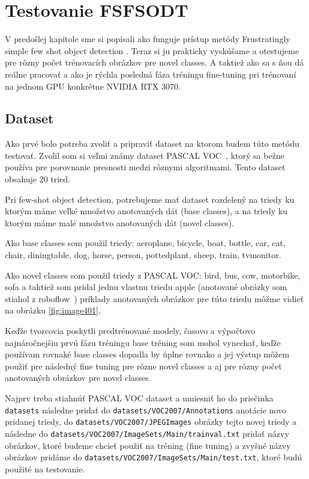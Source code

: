 \chapter{Testovanie FSFSODT}\label{chap:previous_solutions}
V predošlej kapitole sme si popísali ako funguje prístup metódy Frustratingly simple few shot object detection \cite{FSFSODT}. Teraz si ju prakticky vyskúšame a otestujeme pre rôzny počet trénovacích obrázkov pre novel classes. A taktiež ako sa s ňou dá reálne pracovať a ako je rýchla posledná fáza tréningu fine-tuning pri trénovaní na jednom GPU konkrétne NVIDIA RTX 3070. 

\section{Dataset}
Ako prvé bolo potreba zvoliť a pripraviť dataset na ktorom budem túto metódu testovať. Zvolil som si veľmi známy dataset PASCAL VOC~\cite{VOC}, ktorý sa bežne používa pre porovnanie presnosti medzi rôznymi algoritmami. Tento dataset obsahuje 20 tried. 

Pri few-shot object detection, potrebujeme mať dataset rozdelený na triedy ku ktorým máme veľké množstvo anotovaných dát (base classes), a na triedy ku ktorým máme malé množstvo anotovaných dát (novel classes).

Ako base classes som použil triedy: aeroplane, bicycle, boat, bottle, car, cat, chair, diningtable, dog, horse, person, pottedplant, sheep, train, tvmonitor.

Ako novel classes som použil triedy z PASCAL VOC:
bird, bus, cow, motorbike, sofa a taktiež som pridal jednu vlastnu triedu apple (anotované obrázky som stiahol z roboflow~\cite{roboflow}) príklady anotovaných obrázkov pre túto triedu môžme vidieť na obrázku \ref{fig:image401}.

Keďže tvorcovia poskytli predtrénované modely, časovo a výpočtovo najnáročnejšiu prvú fázu tréningu base tréning som mohol vynechať, keďže používam rovnaké base classes dopadla by úplne rovnako a jej výstup môžem použiť pre následný fine tuning pre rôzne novel classes a aj pre rôzny počet anotovaných obrázkov pre novel classes. 

Najprv treba stiahnúť PASCAL VOC dataset a umiesniť ho do priečinka \texttt{datasets} následne pridať do \texttt{datasets/VOC2007/Annotations} anotácie novo pridanej triedy, do \texttt{datasets/VOC2007/JPEGImages} obrázky tejto novej triedy a následne do \texttt{datasets/VOC2007/ImageSets/Main/trainval.txt} pridať názvy obrázkov, ktoré budeme chcieť použiť na tréning (fine tuning) a zvyšné názvy obrázkov pridáme do \texttt{datasets/VOC2007/ImageSets/Main/test.txt}, ktoré budú použité na testovanie. 

